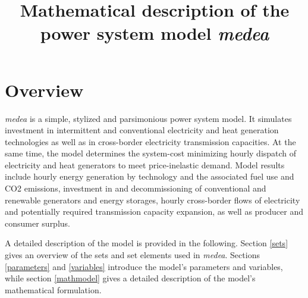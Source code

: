 \documentclass[11pt,a4paper]{article}
\begin{document}
\title{Mathematical description of the power system model \emph{medea}}
\section{Overview}
\emph{medea} is a simple, stylized and parsimonious power system model.
It simulates investment in intermittent and conventional electricity and heat generation technologies as well as in cross-border electricity transmission capacities.
At the same time, the model determines the system-cost minimizing hourly dispatch of electricity and heat generators to meet price-inelastic demand.
Model results include hourly energy generation by technology and the associated fuel use and CO2 emissions, investment in and decommissioning of conventional and renewable generators and energy storages, hourly cross-border flows of electricity and potentially required transmission capacity expansion, as well as producer and consumer surplus.

A detailed description of the model is provided in the following. Section \ref{sets} gives an overview of the sets and set elements used in \emph{medea}. Sections \ref{parameters} and \ref{variables} introduce the model's parameters and variables, while section \ref{mathmodel} gives a detailed description of the model's mathematical formulation.




\end{document}
